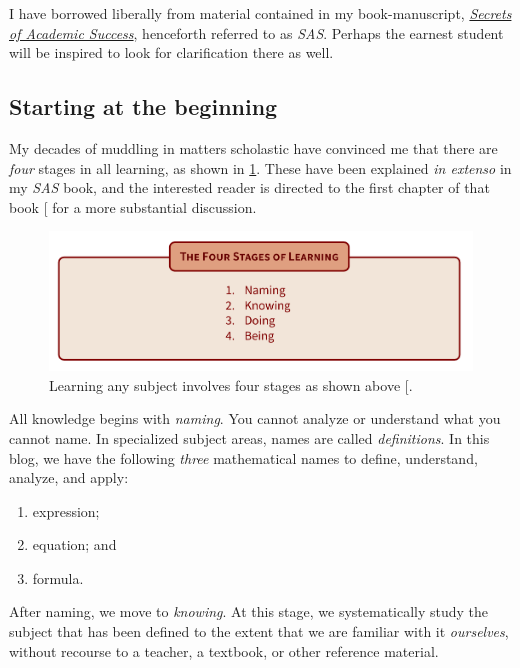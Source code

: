\documentclass[
  a4paper,
]{article}
\providecommand{\tightlist}{%
  \setlength{\itemsep}{0pt}\setlength{\parskip}{0pt}}
\begin{document}
I have borrowed liberally from material contained in my book-manuscript,
\href{https://swanlotus.netlify.app/sas-manuscript/SAS-partial.pdf}{\emph{Secrets
of Academic Success}}, henceforth referred to as \emph{SAS}. Perhaps the
earnest student will be inspired to look for clarification there as
well.  \normalfont

\subsection{Starting at the beginning}\label{starting-at-the-beginning}

My decades of muddling in matters scholastic have convinced me that
there are \emph{four} stages in all learning, as shown in
\cref{fig:four-stages}. These have been explained \emph{in extenso} in
my \emph{SAS} book, and the interested reader is directed to the first
chapter of that book {[}\citeproc{ref-sas}{1}{]} for a more substantial
discussion.

\begin{figure}
\centering
\includegraphics[width=0.9\linewidth,height=\textheight,keepaspectratio]{images/four-stages-of-learning.png}
\caption{Learning any subject involves four stages as shown above
{[}\citeproc{ref-sas}{1}{]}.}\label{fig:four-stages}
\end{figure}

All knowledge begins with \emph{naming}. You cannot analyze or
understand what you cannot name. In specialized subject areas, names are
called \emph{definitions}. In this blog, we have the following
\emph{three} mathematical names to define, understand, analyze, and
apply:

\begin{enumerate}
\tightlist
\item
  expression;
\item
  equation; and
\item
  formula.
\end{enumerate}

After naming, we move to \emph{knowing}. At this stage, we
systematically study the subject that has been defined to the extent
that we are familiar with it \emph{ourselves}, without recourse to a
teacher, a textbook, or other reference material.
\end{document}
